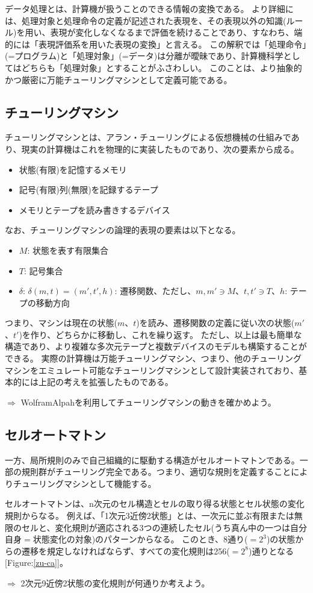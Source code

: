 データ処理とは、計算機が扱うことのできる情報の変換である。
より詳細には、処理対象と処理命令の定義が記述された表現を、その表現以外の知識(ルール)を用い、表現が変化しなくなるまで評価を続けることであり、すなわち、端的には「表現評価系を用いた表現の変換」と言える。
この解釈では「処理命令」(=プログラム)と「処理対象」(=データ)は分離が曖昧であり、計算機科学としてはどちらも「処理対象」とすることがふさわしい。
このことは、より抽象的かつ厳密に万能チューリングマシンとして定義可能である。
\subsection{チューリングマシン}
チューリングマシンとは、アラン・チューリングによる仮想機械の仕組みであり、現実の計算機はこれを物理的に実装したものであり、次の要素から成る。
\begin{itemize}
\item 状態(有限)を記憶するメモリ
\item 記号(有限)列(無限)を記録するテープ
\item メモリとテープを読み書きするデバイス
\end{itemize}
なお、チューリングマシンの論理的表現の要素は以下となる。
\begin{itemize}
\item $M$: 状態を表す有限集合
\item $T$: 記号集合
\item $\delta$: $\delta(m,t) = (m', t', h)$: 遷移関数、ただし、$m,m' \ni M$、$t,t' \ni T$、$h$: テープの移動方向
\end{itemize}
つまり、マシンは現在の状態($m$、$t$)を読み、遷移関数の定義に従い次の状態($m'$、$t'$)を作り、どちらかに移動し、これを繰り返す。
ただし、以上は最も簡単な構造であり、より複雑な多次元テープと複数デバイスのモデルも構築することができる。
実際の計算機は万能チューリングマシン、つまり、他のチューリングマシンをエミュレート可能なチューリングマシンとして設計実装されており、基本的には上記の考えを拡張したものである。
\begin{breakbox}
$\Rightarrow$ WolframAlpahを利用してチューリングマシンの動きを確かめよう。
\end{breakbox}

\subsection{セルオートマトン}
一方、局所規則のみで自己組織的に駆動する構造がセルオートマトンである。一部の規則群がチューリング完全である。つまり、適切な規則を定義することによりチューリングマシンとして機能する。

セルオートマトンは、n次元のセル構造とセルの取り得る状態とセル状態の変化規則からなる。
例えば、「1次元3近傍2状態」とは、一次元に並ぶ有限または無限のセルと、変化規則が適応される3つの連続したセル(うち真ん中の一つは自分自身$=$状態変化の対象)のパターンからなる。
このとき、8通り($=2^3$)の状態からの遷移を規定しなければならず、すべての変化規則は256($=2^8$)通りとなる[Figure:\ref{zu-ca}]。
\begin{breakbox}$\Rightarrow$
2次元9近傍2状態の変化規則が何通りか考えよう。
\end{breakbox}

